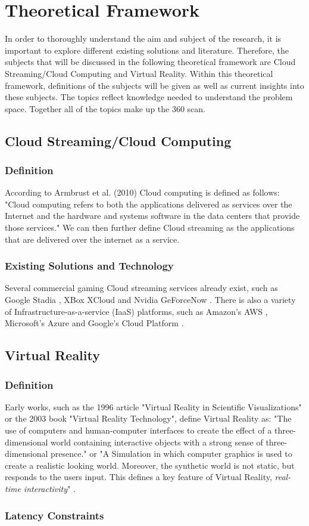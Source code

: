 \section{Theoretical Framework}

In order to thoroughly understand the aim and subject of the research, it is important to explore different existing solutions and literature. Therefore, the subjects that will be discussed in the  following theoretical framework are Cloud Streaming/Cloud Computing and Virtual Reality. Within this theoretical framework, definitions of the subjects will be given as well as current insights into these subjects. The topics reflect knowledge needed to understand the problem space. Together all of the topics make up the 360 scan.

\subsection{Cloud Streaming/Cloud Computing}

\subsubsection{Definition}
According to Armbrust et al. (2010) Cloud computing is defined as follows: 
"Cloud computing refers to both the applications delivered as services over the Internet and the hardware and systems software in the data centers that provide those services." \parencite[]{aviewoncc}
We can then further define Cloud streaming as the applications that are delivered over the internet as a service.

\subsubsection{Existing Solutions and Technology}
Several commercial gaming Cloud streaming services already exist, such as Google Stadia \parencite{stadia}, XBox XCloud \parencite{xcloud} and Nvidia GeForceNow \parencite{geforcenow}. There is also a variety of Infrastructure\hyp{}as\hyp{}a\hyp{}service (IaaS) platforms, such as Amazon's AWS \parencite{aws}, Microsoft's Azure \parencite{azure} and Google's Cloud Platform \parencite{gcp}. 

\subsection{Virtual Reality}

\subsubsection{Definition}
Early works, such as the 1996 article "Virtual Reality in Scientific Visualizations"  or the 2003 book "Virtual Reality Technology", define Virtual Reality as: "The use of computers and human\hyp{}computer interfaces to create the effect of a three\hyp{}dimensional world containing interactive objects with a strong sense of three\hyp{}dimensional presence."\parencite{vrsv} or "A Simulation in which computer graphics is used to create a realistic looking world. Moreover, the synthetic world is not static, but responds to the users input. This defines a key feature of Virtual Reality, \textit{real\hyp{}time interactivity}" \parencite{vrtech}.
\subsubsection{Latency Constraints}